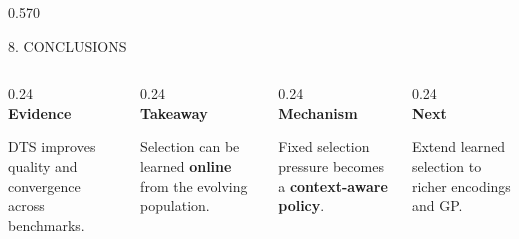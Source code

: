 \documentclass[final]{beamer}
\newcommand{\FSSubhead}{\fontsize{26}{32}\selectfont}    %
\newcommand{\FSBody}{\fontsize{24.5}{30.5}\selectfont}   %
\newcommand{\FSNotes}{\fontsize{19.5}{23.5}\selectfont}  %
\begin{document}
\begin{frame}[t]
\begin{columns}[t,onlytextwidth]
\hfill

\begin{column}{0.570\paperwidth}
\begin{secbox}{8. CONCLUSIONS}
\vspace{2mm}

\begin{columns}[t,onlytextwidth]
  \begin{column}{0.24\linewidth}
    \centering\textcolor{bguMid}{\fontsize{26}{26}\selectfont\faPuzzlePiece}\\[1mm]
    {\FSSubhead\bfseries Evidence}\par\vspace{1mm}
    \FSBody DTS improves quality and convergence across benchmarks.
  \end{column}
  \begin{column}{0.24\linewidth}
    \centering\textcolor{bguMid}{\fontsize{26}{26}\selectfont\faCompass}\\[1mm]
    {\FSSubhead\bfseries Takeaway}\par\vspace{1mm}
    \FSBody Selection can be learned \textbf{online} from the evolving population.
  \end{column}
  \begin{column}{0.24\linewidth}
    \centering\textcolor{bguMid}{\fontsize{26}{26}\selectfont\faSlidersH}\\[1mm]
    {\FSSubhead\bfseries Mechanism}\par\vspace{1mm}
    \FSBody Fixed selection pressure becomes a \textbf{context-aware policy}.
  \end{column}
  \begin{column}{0.24\linewidth}
    \centering\textcolor{bguMid}{\fontsize{26}{26}\selectfont\faArrowRight}\\[1mm]
    {\FSSubhead\bfseries Next}\par\vspace{1mm}
    \FSBody Extend learned selection to richer encodings and GP.
  \end{column}
\end{columns}
\end{secbox}
\end{column}

\end{columns}

\vfill
\end{frame}
\end{document}
